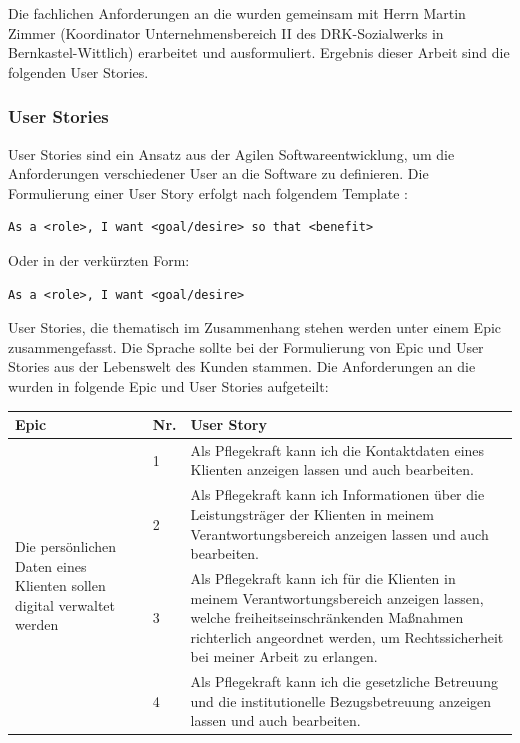 Die fachlichen Anforderungen an die \EBP wurden gemeinsam mit Herrn Martin Zimmer (Koordinator Unternehmensbereich II des DRK-Sozialwerks in
Bernkastel-Wittlich) erarbeitet und ausformuliert. Ergebnis dieser Arbeit sind die folgenden User Stories.

\subsubsection{User Stories}
\label{subsubsec:userstories}
User Stories sind ein Ansatz aus der Agilen Softwareentwicklung, um die Anforderungen verschiedener User an die Software zu definieren. Die
Formulierung einer User Story erfolgt nach folgendem Template \cite{Wikipedia_User_Story}:
\begin{lstlisting}
As a <role>, I want <goal/desire> so that <benefit>
\end{lstlisting}
Oder in der verkürzten Form:
\begin{lstlisting}
As a <role>, I want <goal/desire>
\end{lstlisting}
User Stories, die thematisch im Zusammenhang stehen werden unter einem Epic zusammengefasst. Die Sprache sollte bei der Formulierung
 von Epic und User Stories aus der Lebenswelt des Kunden stammen. Die Anforderungen an die \EBP wurden in folgende Epic und User Stories aufgeteilt:
\newline

\begin{longtable}{| p{}|p{}|p{} | }
  \hline
 \textbf{Epic} & \textbf{Nr.} & \textbf{User Story} \\
  \hline
\multirow{4}{0.25\textwidth}{Die persönlichen Daten eines Klienten sollen digital verwaltet werden} & 1 & Als Pflegekraft kann ich die Kontaktdaten eines Klienten anzeigen lassen und auch bearbeiten.  \\
  \cline{2 -3}
& 2 & Als Pflegekraft kann ich Informationen über die Leistungsträger der Klienten in meinem Verantwortungsbereich anzeigen lassen und
auch bearbeiten.\\
   \cline{2 - 3}
& 3 & Als Pflegekraft kann ich für die Klienten in meinem Verantwortungsbereich anzeigen lassen, welche freiheitseinschränkenden
Maßnahmen richterlich angeordnet werden, um Rechtssicherheit bei meiner Arbeit zu erlangen.\\
   \cline{2 - 3}
& 4 & Als Pflegekraft kann ich die gesetzliche Betreuung und die institutionelle Bezugsbetreuung anzeigen lassen und auch bearbeiten.\\
  \hline
\end{longtable}

